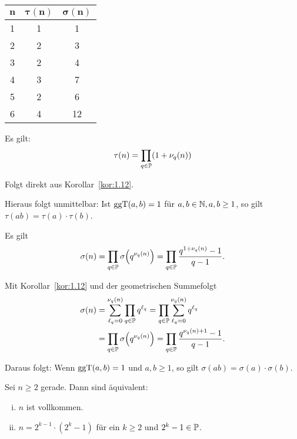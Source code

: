 	\begin{center}
			\begin{tabular}{|ccc|}
			\hline 
			$\bm{n}$ & $\bm{\tau(n)}$ & $\bm{\sigma(n)}$ \\ 
			\hline 
			1 & 1 & 1 \\ 
			\hline 
			2 & 2 & 3 \\ 
			\hline 
			3 & 2 & 4 \\ 
			\hline 
			4 & 3 & 7 \\ 
			\hline 
			5 & 2 & 6 \\ 
			\hline 
			6 & 4 & 12 \\ 
			\hline 
		\end{tabular}
	\end{center}

	\begin{lemma}
		Es gilt:
		\[
			\tau(n) = \prod_{q \in \mathbb{P}} (1+ \nu_q(n))
		\]
	\end{lemma}

	\begin{beweis}
		Folgt direkt aus Korollar~\ref{kor:1.12}.
	\end{beweis}
	
	Hieraus folgt unmittelbar: Ist $\operatorname{ggT}(a,b) = 1$ für $a,b \in \mathbb{N}, a,b \geq 1$, so gilt $\tau(ab) = \tau(a) \cdot \tau(b)$.
	
	\begin{lemma}
		Es gilt
		\[
			\sigma(n) = \prod_{q \in \PP} \sigma \enb{q^{\nu_q(n)}} = \prod_{q \in \PP} \frac{q^{1+ \nu_q(n)}-1}{q-1}.
		\]
	\end{lemma}

	\begin{beweis}
		Mit Korollar~\ref{kor:1.12} und der geometrischen Summefolgt
		\begin{align*}
			\sigma(n) &= \sum_{\ell_q = 0}^{\nu_q(n)} \prod_{q \in \PP} q^{\ell_q} = \prod_{q \in \PP} \sum_{\ell_q = 0}^{\nu_q(n)} q^{\ell_q} \\
			&= \prod_{q \in \PP} \sigma \enb{q^{\nu_q(n)}} = \prod_{q \in \PP} \frac{q^{\nu_q(n)+1}-1}{q-1}.
		\end{align*}
	\end{beweis}

	Daraus folgt: Wenn $\operatorname{ggT}(a,b) = 1$ und $a,b \geq 1$, so gilt $\sigma(ab) = \sigma(a) \cdot \sigma(b)$.
	
	\begin{thm}
		\label{thm:1.15}
		Sei $n \geq 2$ gerade. \marginnote{[15]}
		Dann sind äquivalent:
		\begin{enumerate}[(i)]
			\item $n$ ist vollkommen.
			\item $n = 2^{k-1} \cdot (2^k - 1)$ für ein $k \geq 2$ und $2^k - 1 \in \mathbb{P}$.
		\end{enumerate}
	\end{thm}

